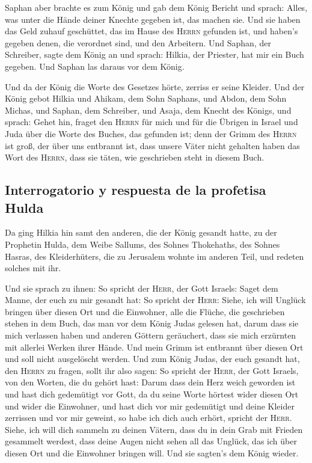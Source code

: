  Saphan aber brachte es zum König und gab dem König
Bericht und sprach: Alles, was unter die Hände deiner Knechte gegeben
ist, das machen sie.  Und sie haben das Geld zuhauf
geschüttet, das im Hause des \textsc{Herrn} gefunden ist, und haben's
gegeben denen, die verordnet sind, und den Arbeitern. 
Und Saphan, der Schreiber, sagte dem König an und sprach: Hilkia, der
Priester, hat mir ein Buch gegeben. Und Saphan las daraus vor dem König.

 Und da der König die Worte des Gesetzes hörte, zerriss
er seine Kleider.  Und der König gebot Hilkia und Ahikam,
dem Sohn Saphans, und Abdon, dem Sohn Michas, und Saphan, dem Schreiber,
und Asaja, dem Knecht des Königs, und sprach:  Gehet hin,
fraget den \textsc{Herrn} für mich und für die Übrigen in Israel und
Juda über die Worte des Buches, das gefunden ist; denn der Grimm des
\textsc{Herrn} ist groß, der über uns entbrannt ist, dass unsere Väter
nicht gehalten haben das Wort des \textsc{Herrn}, dass sie täten, wie
geschrieben steht in diesem Buch.

\hypertarget{interrogatorio-y-respuesta-de-la-profetisa-hulda}{%
\subsection{Interrogatorio y respuesta de la profetisa
Hulda}\label{interrogatorio-y-respuesta-de-la-profetisa-hulda}}

 Da ging Hilkia hin samt den anderen, die der König
gesandt hatte, zu der Prophetin Hulda, dem Weibe Sallums, des Sohnes
Thokehaths, des Sohnes Hasras, des Kleiderhüters, die zu Jerusalem
wohnte im anderen Teil, und redeten solches mit ihr.

 Und sie sprach zu ihnen: So spricht der \textsc{Herr},
der Gott Israels: Saget dem Manne, der euch zu mir gesandt hat:
 So spricht der \textsc{Herr}: Siehe, ich will Unglück
bringen über diesen Ort und die Einwohner, alle die Flüche, die
geschrieben stehen in dem Buch, das man vor dem König Judas gelesen hat,
 darum dass sie mich verlassen haben und anderen Göttern
geräuchert, dass sie mich erzürnten mit allerlei Werken ihrer Hände. Und
mein Grimm ist entbrannt über diesen Ort und soll nicht ausgelöscht
werden.  Und zum König Judas, der euch gesandt hat, den
\textsc{Herrn} zu fragen, sollt ihr also sagen: So spricht der
\textsc{Herr}, der Gott Israels, von den Worten, die du gehört hast:
 Darum dass dein Herz weich geworden ist und hast dich
gedemütigt vor Gott, da du seine Worte hörtest wider diesen Ort und
wider die Einwohner, und hast dich vor mir gedemütigt und deine Kleider
zerrissen und vor mir geweint, so habe ich dich auch erhört, spricht der
\textsc{Herr}.  Siehe, ich will dich sammeln zu deinen
Vätern, dass du in dein Grab mit Frieden gesammelt werdest, dass deine
Augen nicht sehen all das Unglück, das ich über diesen Ort und die
Einwohner bringen will. Und sie sagten's dem König wieder.

